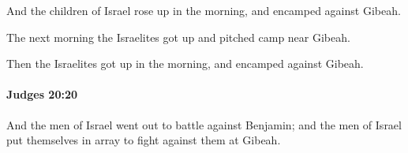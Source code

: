 			\begin{versebox}
					\item[BHS] 
					\item[ASV] And the children of Israel rose up in the morning, and encamped against Gibeah.
					\item[NIV] The next morning the Israelites got up and pitched camp near Gibeah.
					\item[NRSV] Then the Israelites got up in the morning, and encamped against Gibeah.
			\end{versebox}

		\paragraph{Judges 20:20} %
			\label{JUDGES-20-20}

			And the men of Israel went out to battle against Benjamin; and the men of Israel put themselves in array to fight against them at Gibeah.

